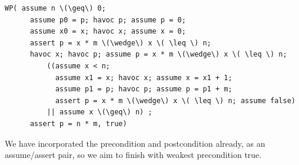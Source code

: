 \documentclass[11pt]{article}
\begin{document}
\begin{Verbatim}[commandchars=\\\{\}]
  WP( assume n \(\geq\) 0;
      assume p0 = p; havoc p; assume p = 0; 
      assume x0 = x; havoc x; assume x = 0; 
      assert p = x * m \(\wedge\) x \( \leq \) n;
      havoc x; havoc p; assume p = x * m \(\wedge\) x \( \leq \) n;
          ((assume x < n; 
            assume x1 = x; havoc x; assume x = x1 + 1; 
            assume p1 = p; havoc p; assume p = p1 + m; 
            assert p = x * m \(\wedge\) x \( \leq \) n; assume false) 
          || assume x \(\geq\) n) ;
      assert p = n * m, true)
\end{Verbatim}
We have incorporated the precondition and postcondition already, as an assume/assert pair, so we aim to finish with weakest precondition \textsf{true}.
\end{document}
